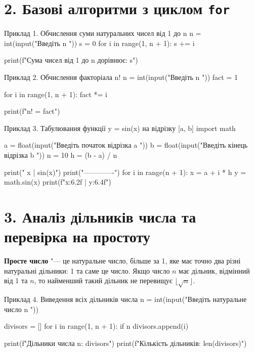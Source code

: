 \documentclass{scrreprt}
\begin{document}
	\section*{2. Базові алгоритми з циклом \texttt{for}}

	\begin{py}{Приклад 1. Обчислення суми натуральних чисел від 1 до n}
n = int(input("Введіть n "))
s = 0
for i in range(1, n + 1):
    s += i

print(f"Сума чисел від 1 до {n} дорівнює: {s}")
	\end{py}

	\begin{py}{Приклад 2. Обчислення факторіала n!}
n = int(input("Введіть n "))
fact = 1

for i in range(1, n + 1):
    fact *= i

print(f"{n}! = {fact}")
	\end{py}

	\newpage

	\begin{py}{Приклад 3. Табулювання функції y = sin(x) на відрізку [a, b]}
import math

a = float(input("Введіть початок відрізка a "))
b = float(input("Введіть кінець відрізка b "))
n = 10
h = (b - a) / n

print(" x | sin(x)")
print("-------------")
for i in range(n + 1):
    x = a + i * h
    y = math.sin(x)
    print(f"{x:6.2f} | {y:6.4f}")
	\end{py}

	\vspace{0.5cm}

	\section*{3. Аналіз дільників числа та перевірка на простоту}

	\begin{tcolorbox}[colback=pyblue!5!white,colframe=pyblue,title=\textbf{Математична довідка},fonttitle=\sffamily\bfseries]
		\textbf{Просте число} "--- це натуральне число, більше за 1, яке має точно два різні натуральні дільники: 1 та саме це число. Якщо число $n$ має дільник, відмінний від 1 та $n$, то найменший такий дільник не перевищує $\lfloor\sqrt{n}\rfloor$.
	\end{tcolorbox}

	\begin{py}{Приклад 4. Виведення всіх дільників числа}
n = int(input("Введіть натуральне число n "))

divisors = []
for i in range(1, n + 1):
    if n %
        divisors.append(i)

print(f"Дільники числа {n}: {divisors}")
print(f"Кількість дільників: {len(divisors)}")
	\end{py}
\end{document}
